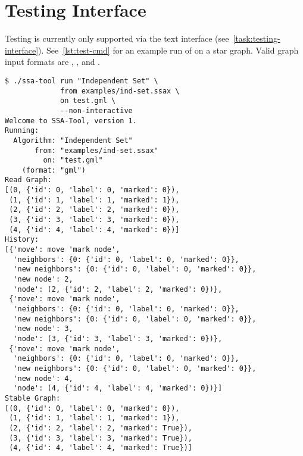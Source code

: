 \section{Testing Interface}
\label{sec:interface-testing}

Testing is currently only supported via the text interface (see~\autoref{task:testing-interface}).
See~\autoref{lst:test-cmd} for an example run of  on a star graph.
Valid graph input formats are , , and .

\begin{lstlisting}[language={},float=!h,caption={A model testing session using the command-line utility.},label={lst:test-cmd}]
$ ./ssa-tool run "Independent Set" \
             from examples/ind-set.ssax \
             on test.gml \
             --non-interactive
Welcome to SSA-Tool, version 1.
Running:
  Algorithm: "Independent Set"
       from: "examples/ind-set.ssax"
         on: "test.gml"
    (format: "gml")
Read Graph:
[(0, {'id': 0, 'label': 0, 'marked': 0}),
 (1, {'id': 1, 'label': 1, 'marked': 1}),
 (2, {'id': 2, 'label': 2, 'marked': 0}),
 (3, {'id': 3, 'label': 3, 'marked': 0}),
 (4, {'id': 4, 'label': 4, 'marked': 0})]
History:
[{'move': move 'mark node',
  'neighbors': {0: {'id': 0, 'label': 0, 'marked': 0}},
  'new neighbors': {0: {'id': 0, 'label': 0, 'marked': 0}},
  'new node': 2,
  'node': (2, {'id': 2, 'label': 2, 'marked': 0})},
 {'move': move 'mark node',
  'neighbors': {0: {'id': 0, 'label': 0, 'marked': 0}},
  'new neighbors': {0: {'id': 0, 'label': 0, 'marked': 0}},
  'new node': 3,
  'node': (3, {'id': 3, 'label': 3, 'marked': 0})},
 {'move': move 'mark node',
  'neighbors': {0: {'id': 0, 'label': 0, 'marked': 0}},
  'new neighbors': {0: {'id': 0, 'label': 0, 'marked': 0}},
  'new node': 4,
  'node': (4, {'id': 4, 'label': 4, 'marked': 0})}]
Stable Graph:
[(0, {'id': 0, 'label': 0, 'marked': 0}),
 (1, {'id': 1, 'label': 1, 'marked': 1}),
 (2, {'id': 2, 'label': 2, 'marked': True}),
 (3, {'id': 3, 'label': 3, 'marked': True}),
 (4, {'id': 4, 'label': 4, 'marked': True})]
\end{lstlisting}

